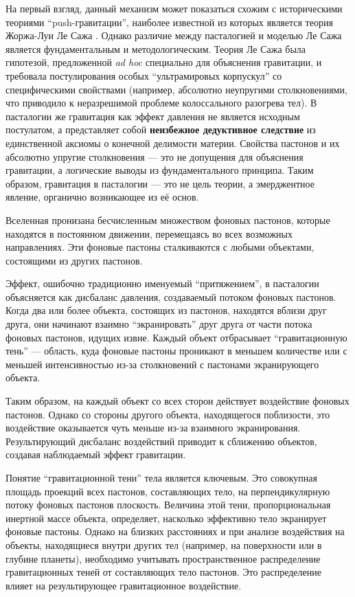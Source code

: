 \documentclass[pdflatex,sn-mathphys-num,referee]{sn-jnl}
\begin{document}
На первый взгляд, данный механизм может показаться схожим с историческими теориями ``push-гравитации'', наиболее известной из которых является теория Жоржа-Луи Ле Сажа \cite{lesage-edwards2014}. Однако различие между пасталогией и моделью Ле Сажа является фундаментальным и методологическим. Теория Ле Сажа была гипотезой, предложенной \textit{ad hoc} специально для объяснения гравитации, и требовала постулирования особых ``ультрамировых корпускул'' со специфическими свойствами (например, абсолютно неупругими столкновениями, что приводило к неразрешимой проблеме колоссального разогрева тел). В пасталогии же гравитация как эффект давления не является исходным постулатом, а представляет собой \textbf{неизбежное дедуктивное следствие} из единственной аксиомы о конечной делимости материи. Свойства пастонов и их абсолютно упругие столкновения --- это не допущения для объяснения гравитации, а логические выводы из фундаментального принципа. Таким образом, гравитация в пасталогии --- это не цель теории, а эмерджентное явление, органично возникающее из её основ.

Вселенная пронизана бесчисленным множеством фоновых пастонов, которые находятся в постоянном движении, перемещаясь во всех возможных направлениях. Эти фоновые пастоны сталкиваются с любыми объектами, состоящими из других пастонов.

Эффект, ошибочно традиционно именуемый ``притяжением'', в пасталогии объясняется как дисбаланс давления, создаваемый потоком фоновых пастонов. Когда два или более объекта, состоящих из пастонов, находятся вблизи друг друга, они начинают взаимно ``экранировать'' друг друга от части потока фоновых пастонов, идущих извне. Каждый объект отбрасывает ``гравитационную тень'' --- область, куда фоновые пастоны проникают в меньшем количестве или с меньшей интенсивностью из-за столкновений с пастонами экранирующего объекта.

Таким образом, на каждый объект со всех сторон действует воздействие фоновых пастонов. Однако со стороны другого объекта, находящегося поблизости, это воздействие оказывается чуть меньше из-за взаимного экранирования. Результирующий дисбаланс воздействий приводит к сближению объектов, создавая наблюдаемый эффект гравитации.

Понятие ``гравитационной тени'' тела является ключевым. Это совокупная площадь проекций всех пастонов, составляющих тело, на перпендикулярную потоку фоновых пастонов плоскость. Величина этой тени, пропорциональная инертной массе объекта, определяет, насколько эффективно тело экранирует фоновые пастоны. Однако на близких расстояниях и при анализе воздействия на объекты, находящиеся внутри других тел (например, на поверхности или в глубине планеты), необходимо учитывать пространственное распределение гравитационных теней от составляющих тело пастонов. Это распределение влияет на результирующее гравитационное воздействие.
\end{document}
